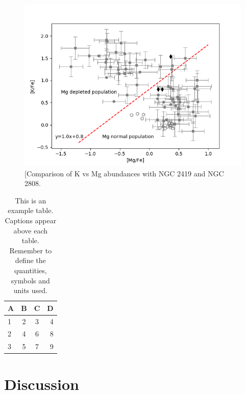 \documentclass[a4paper,fleqn,usenatbib]{mnras}
\begin{document}
\begin{figure}
	\includegraphics[width=\columnwidth]{KvsMgab.png}
    \caption{[Comparison of K vs Mg abundances with NGC 2419 and NGC 2808.}
    \label{KvsMg}
\end{figure}


\begin{table}
	\centering
	\caption{This is an example table. Captions appear above each table.
	Remember to define the quantities, symbols and units used.}
	\label{tab:example_table}
	\begin{tabular}{lccr} %
		\hline
		A & B & C & D\\
		\hline
		1 & 2 & 3 & 4\\
		2 & 4 & 6 & 8\\
		3 & 5 & 7 & 9\\
		\hline
	\end{tabular}
\end{table}

\section{Discussion}
\end{document}
